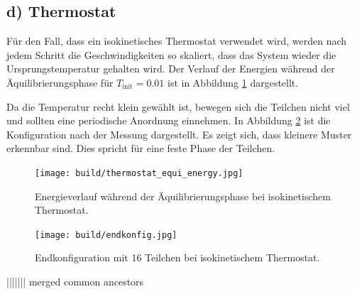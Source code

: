 \FloatBarrier
 \subsection*{d) Thermostat}

Für den Fall, dass ein isokinetisches Thermostat verwendet wird, werden nach jedem Schritt die Geschwindigkeiten so skaliert, dass das System wieder die Ursprungstemperatur gehalten wird.
Der Verlauf der Energien während der Äquilibrierungsphase für $T_\text{init} = 0.01$ ist in Abbildung \ref{fig:thermostat_equi_energy}   dargestellt.

Da die Temperatur recht klein gewählt ist, bewegen sich die Teilchen nicht viel
und sollten eine periodische Anordnung einnehmen.
In Abbildung \ref{fig:endkonfig} ist die Konfiguration nach der Messung dargestellt.
Es zeigt sich, dass kleinere Muster erkennbar sind.
Dies spricht für eine feste Phase der Teilchen.
\begin{figure}
    \centering
    \texttt{[image: build/thermostat\_equi\_energy.jpg]}
    \caption{Energieverlauf während der Äquilibrierungsphase bei isokinetischem Thermostat.}
    \label{fig:thermostat_equi_energy}
\end{figure}
\begin{figure}
    \centering
    \texttt{[image: build/endkonfig.jpg]}
    \caption{Endkonfiguration mit 16 Teilchen bei isokinetischem Thermostat.}
    \label{fig:endkonfig}
\end{figure}
||||||| merged common ancestors
%
%
